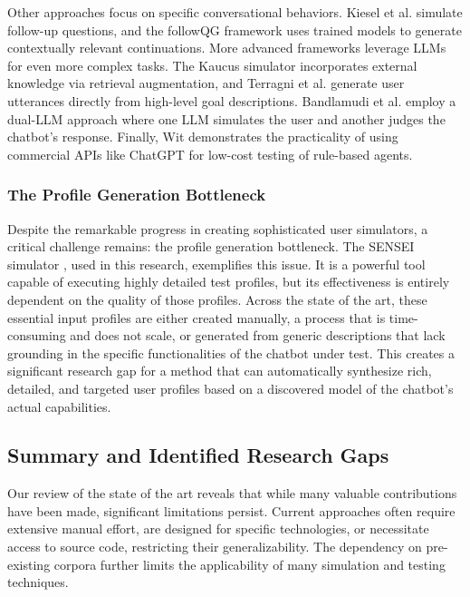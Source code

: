 Other approaches focus on specific conversational behaviors.
Kiesel et al. \autocite{kieselSimulatingFollowUpQuestions2024}
simulate follow-up questions,
and the followQG framework \autocite{bImprovingAsynchronousInterview2021}
uses trained models to generate contextually relevant continuations.
More advanced frameworks leverage \acp{LLM} for even more complex tasks.
The Kaucus simulator \autocite{dholeKAUCUSKnowledgeAugmented2024}
incorporates external knowledge via retrieval augmentation,
and Terragni et al. \autocite{terragniInContextLearningUser2023}
generate user utterances directly from high-level goal descriptions.
Bandlamudi et al. \autocite{bandlamudiFrameworkEnableTest2024}
employ a dual-\ac{LLM} approach where
one \ac{LLM} simulates the user and
another judges the chatbot's response.
Finally, Wit \autocite{dewitLeveragingLargeLanguage2024}
demonstrates the practicality of using commercial APIs like ChatGPT
for low-cost testing of rule-based agents.

\subsubsection{The Profile Generation Bottleneck}
Despite the remarkable progress in creating sophisticated user simulators,
a critical challenge remains: the profile generation bottleneck.
The SENSEI simulator \autocite{delaraSensei},
used in this research, exemplifies this issue.
It is a powerful tool capable of executing highly detailed test profiles,
but its effectiveness is entirely dependent on the quality of those profiles.
Across the state of the art,
these essential input profiles are either created manually,
a process that is time-consuming and does not scale,
or generated from generic descriptions
that lack grounding in the specific functionalities of the chatbot under test.
This creates a significant research gap
for a method that can automatically synthesize
rich, detailed, and targeted user profiles
based on a discovered model of the chatbot's actual capabilities.

\subsection{Summary and Identified Research Gaps}
Our review of the state of the art
reveals that while many valuable contributions have been made,
significant limitations persist.
Current approaches often require extensive manual effort,
are designed for specific technologies,
or necessitate access to source code,
restricting their generalizability.
The dependency on pre-existing corpora
further limits the applicability
of many simulation and testing techniques.

